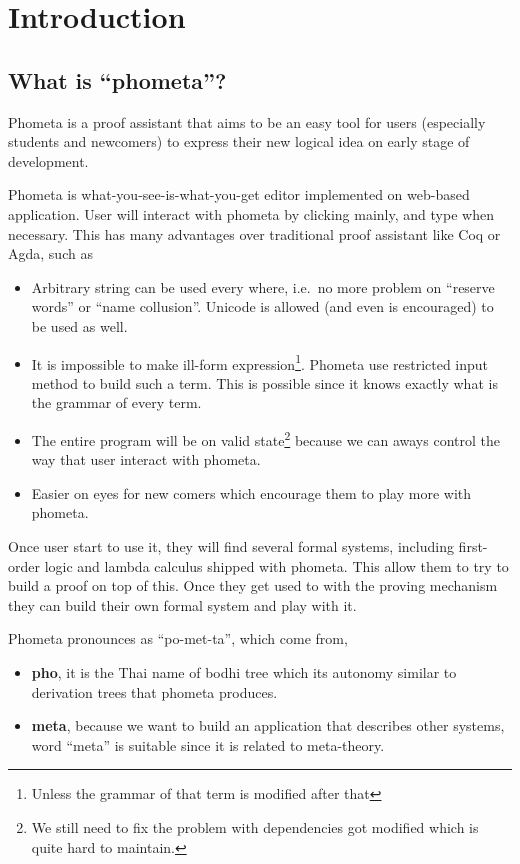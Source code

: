 \documentclass[master.tex]{subfiles}
\begin{document}
\chapter{Introduction}

\section{What is ``phometa''?}

Phometa is a proof assistant that aims to be an easy tool for users (especially students and newcomers) to express their new logical idea on early stage of development.

Phometa is what-you-see-is-what-you-get editor implemented on web-based application. User will interact with phometa by clicking mainly, and type when necessary. This has many advantages over traditional proof assistant like Coq or Agda, such as
\begin{itemize}
    \item Arbitrary string can be used every where, i.e.\ no more problem on ``reserve words'' or ``name collusion''. Unicode is allowed (and even is encouraged) to be used as well.
    \item It is impossible to make ill-form expression\footnote{Unless the grammar of that term is modified after that}. Phometa use restricted input method to build such a term. This is possible since it knows exactly what is the grammar of every term.
    \item The entire program will be on valid state\footnote{We still need to fix the problem with dependencies got modified which is quite hard to maintain.} because we can aways control the way that user interact with phometa.
    \item Easier on eyes for new comers which encourage them to play more with phometa.
\end{itemize}

Once user start to use it, they will find several formal systems, including first-order logic and lambda calculus shipped with phometa. This allow them to try to build a proof on top of this. Once they get used to with the proving mechanism they can build their own formal system and play with it.

Phometa pronounces as ``po-met-ta'', which come from,
\begin{itemize}
    \item \textbf{pho}, it is the Thai name of bodhi tree which its autonomy similar to derivation trees that phometa produces.
    \item \textbf{meta}, because we want to build an application that describes other systems, word ``meta'' is suitable since it is related to meta-theory.
\end{itemize}
\end{document}
